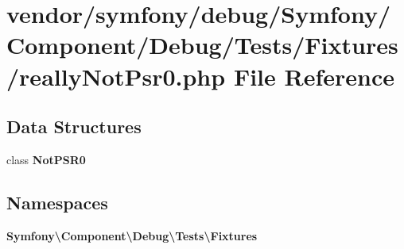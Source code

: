 \section{vendor/symfony/debug/\+Symfony/\+Component/\+Debug/\+Tests/\+Fixtures/really\+Not\+Psr0.php File Reference}
\label{really_not_psr0_8php}
\subsection*{Data Structures}
\begin{DoxyCompactItemize}
\item 
class {\bf Not\+P\+S\+R0}
\end{DoxyCompactItemize}
\subsection*{Namespaces}
\begin{DoxyCompactItemize}
\item 
 {\bf Symfony\textbackslash{}\+Component\textbackslash{}\+Debug\textbackslash{}\+Tests\textbackslash{}\+Fixtures}
\end{DoxyCompactItemize}
